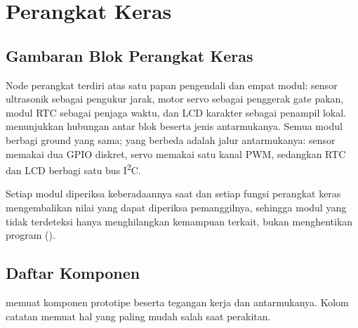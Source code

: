 \chapter{Perangkat Keras}
\label{ch:03-perangkat-keras}

\section{Gambaran Blok Perangkat Keras}

Node perangkat terdiri atas satu papan pengendali dan empat modul: sensor
ultrasonik sebagai pengukur jarak, motor servo sebagai penggerak gate pakan, modul
RTC sebagai penjaga waktu, dan LCD karakter sebagai penampil lokal.
 menunjukkan hubungan antar blok beserta jenis
antarmukanya. Semua modul berbagi ground yang sama; yang berbeda adalah jalur
antarmukanya: sensor memakai dua GPIO diskret, servo memakai satu kanal PWM,
sedangkan RTC dan LCD berbagi satu bus I\textsuperscript{2}C.


Setiap modul diperiksa keberadaannya saat  dan setiap fungsi
perangkat keras mengembalikan nilai yang dapat diperiksa pemanggilnya, sehingga
modul yang tidak terdeteksi hanya menghilangkan kemampuan terkait, bukan
menghentikan program ().

\section{Daftar Komponen}

 memuat komponen prototipe beserta tegangan kerja dan
antarmukanya. Kolom catatan memuat hal yang paling mudah salah saat perakitan.

